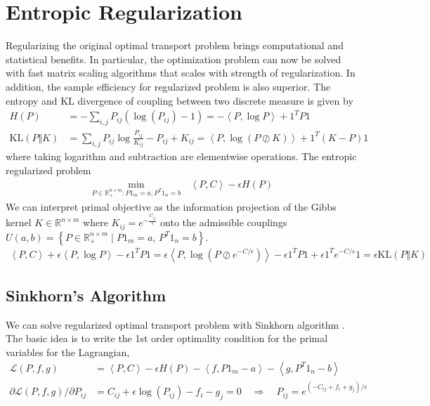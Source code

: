 \documentclass{6838publ}
\newcommand\sL{\ensuremath{\mathcal{L}}}
\newcommand\R{\ensuremath{\mathbb{R}}} %
\newcommand\inner[2]{\ensuremath{\left< #1, #2 \right>}} %
\newcommand\pc[1]{\ensuremath{\left\{ #1 \right\}}} %
\begin{document}
\section{Entropic Regularization}

Regularizing the original optimal transport problem brings computational and statistical benefits. In particular, the optimization problem can now be solved with fast matrix scaling algorithms that scales with strength of regularization. In addition, the sample efficiency for regularized problem is also superior. The entropy and KL divergence of coupling between two discrete measure is given by
\begin{align}
    H(P)
        &= -\sum_{i,j} P_{ij}(\log(P_{ij})-1)
        = - \inner{P}{\log P} + 1^TP1 \\
    \text{KL}(P\Vert K)
        &= \sum_{i,j} P_{ij} \log \frac{P_{ij}}{K_{ij}} - P_{ij} + K_{ij}
        = \inner{P}{\log(P\oslash K)} + 1^T(K-P)1
\end{align}
where taking logarithm and subtraction are elementwise operations. The entropic regularized problem
\begin{align}
    \min_{P\in\R^{n\times m}_+:P1_m=a,P^T1_n=b}\,
        &\inner{P}{C} - \epsilon H(P)
    \label{eq:opt_entropic_regularized_ot}
\end{align}
We can interpret primal objective as the information projection of the Gibbs kernel $K\in\R^{n\times m}$ where $K_{ij}=e^{-\frac{C_{ij}}{\epsilon}}$ onto the admissible couplings $U(a,b)=\pc{P\in\R^{n\times m}_+\mid P1_m=a,\, P^T1_n=b}$.
\begin{align}
    \inner{P}{C} + \epsilon\inner{P}{\log P} - \epsilon 1^T P 1
        = \epsilon \inner{P}{\log\left(P \oslash e^{-C/\epsilon} \right)} - \epsilon 1^TP1 + \epsilon 1^Te^{-C/\epsilon}1
        = \epsilon \text{KL}(P\Vert K)
\end{align}

\subsection{Sinkhorn's Algorithm}

We can solve regularized optimal transport problem with Sinkhorn algorithm \cite{cuturiSinkhornDistancesLightspeed2013}. The basic idea is to write the 1st order optimality condition for the primal variables for the Lagrangian,
\begin{align}
    \sL(P,f,g)
        &= \inner{P}{C} - \epsilon H(P) - \inner{f}{P1_m-a}- \inner{g}{P^T1_n-b} \\
    \partial \sL(P,f,g)/\partial P_{ij}
        &= C_{ij} + \epsilon \log(P_{ij}) - f_i - g_j = 0
        \quad\Rightarrow\quad
        P_{ij} = e^{(-C_{ij}+f_i+g_j)/\epsilon}
\end{align}
\end{document}
